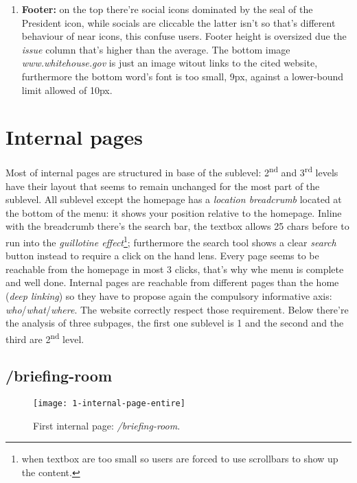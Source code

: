 \documentclass[
10pt, %
a4paper, %
oneside, %
headinclude,footinclude, %
BCOR5mm, %
]{scrartcl}
\begin{document}
\begin{enumerate}
		\item \textbf{Footer:} on the top there're social icons dominated by the seal of the President icon, while socials are cliccable the latter isn't so that's different behaviour of near icons, this confuse users.
		Footer height is oversized due the \emph{issue} column that's higher than the average. The bottom image \emph{www.whitehouse.gov} is just an image witout links to the cited website, furthermore the bottom word's font is too small, 9px, against a lower-bound limit allowed of 10px. 
		
	\end{enumerate}


\section{Internal pages}
Most of internal pages are structured in base of the sublevel: 2\textsuperscript{nd} and 3\textsuperscript{rd} levels have their layout that seems to remain unchanged for the most part of the sublevel.
All sublevel except the homepage has a \emph{location breadcrumb} located at the bottom of the menu: it shows your position relative to the homepage. Inline with the breadcrumb there's the search bar, the textbox allows 25 chars before to run into the \emph{guillotine effect}\footnote{when textbox are too small so users are forced to use scrollbars to show up the content.}; furthermore the search tool shows a clear \emph{search} button instead to require a click on the hand lens. 
Every page seems to be reachable from the homepage in most 3 clicks, that's why whe menu is complete and well done. 
Internal pages are reachable from different pages than the home (\emph{deep linking}) so they have to propose again the compulsory informative axis: \emph{who}/\emph{what}/\emph{where}. The website correctly respect those requirement.
Below there're the analysis of three subpages, the first one sublevel is 1 and the second and the third are 2\textsuperscript{nd} level.

	\subsection{/briefing-room}
	\label{primapaginainterna}
	

	\begin{figure}[h!]
	\centering 
	\centerline{\texttt{[image: 1-internal-page-entire]}}
	\caption[First internal page: /briefing-room]{First internal page: \emph{/briefing-room}.}
	\label{fig:primapaginainterna} 
	\end{figure}
\end{document}
